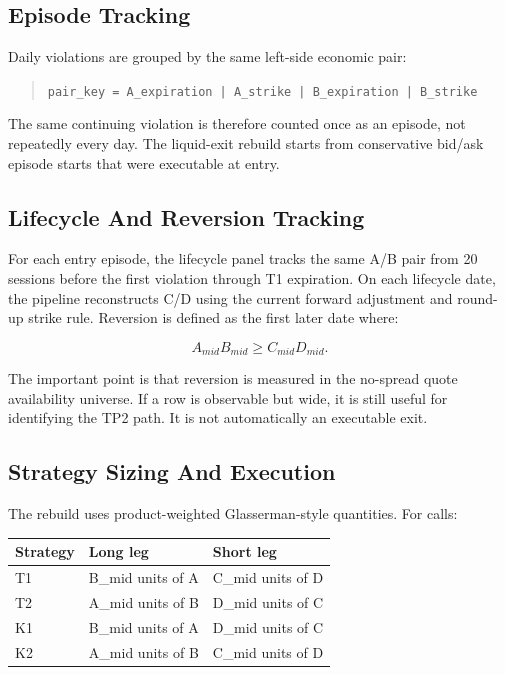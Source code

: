 \documentclass[11pt]{article}
\begin{document}
\subsection{Episode Tracking}

Daily violations are grouped by the same left-side economic pair:

\begin{quote}\small
\texttt{pair\_key = A\_expiration | A\_strike | B\_expiration | B\_strike}
\end{quote}

The same continuing violation is therefore counted once as an episode, not repeatedly every day.
The liquid-exit rebuild starts from conservative bid/ask episode starts that were executable at
entry.

\subsection{Lifecycle And Reversion Tracking}

For each entry episode, the lifecycle panel tracks the same A/B pair from 20 sessions before the
first violation through T1 expiration. On each lifecycle date, the pipeline reconstructs C/D using
the current forward adjustment and round-up strike rule. Reversion is defined as the first later
date where:

\[
A_{mid}B_{mid} \ge C_{mid}D_{mid}.
\]

The important point is that reversion is measured in the no-spread quote availability universe.
If a row is observable but wide, it is still useful for identifying the TP2 path. It is not
automatically an executable exit.

\subsection{Strategy Sizing And Execution}

The rebuild uses product-weighted Glasserman-style quantities. For calls:

\begin{center}
\begin{tabular}{lll}
\toprule
Strategy & Long leg & Short leg \\
\midrule
T1 & B\_mid units of A & C\_mid units of D \\
T2 & A\_mid units of B & D\_mid units of C \\
K1 & B\_mid units of A & D\_mid units of C \\
K2 & A\_mid units of B & C\_mid units of D \\
\bottomrule
\end{tabular}
\end{center}
\end{document}
